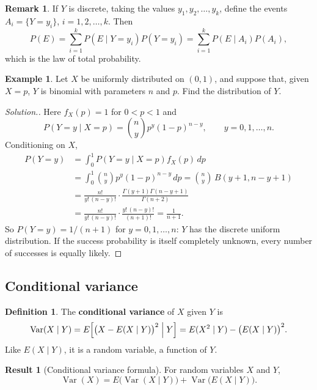 \documentclass[11pt,a4paper]{article}
\theoremstyle{definition}
\newtheorem{defn}[thm]{Definition}
\newtheorem{exa}[thm]{Example}
\newtheorem{result}[thm]{Result}
\newtheorem*{remark}{Remark}
\newenvironment{solution}
  {\renewcommand{\qedsymbol}{}\begin{proof}[\textit{Solution}.]}
  {\end{proof}}
\DeclareMathOperator{\Var}{Var}
\begin{document}
\begin{remark}
If $Y$ is discrete, taking the values $y_1, y_2, \dots, y_k$, define the events $A_i = \{Y = y_i\}$, $i = 1, 2, \dots, k$. Then
\[
P(E) = \sum_{i=1}^kP(E \mid Y = y_i)P(Y = y_i) = \sum_{i=1}^kP(E \mid A_i)P(A_i) ,
\]
which is the law of total probability.
\end{remark}

\begin{exa}\label{exa:beta-binomial}
Let $X$ be uniformly distributed on $(0, 1)$, and suppose that, given $X = p$, $Y$ is binomial with parameters $n$ and $p$. Find the
distribution of $Y$.
\end{exa}

\begin{solution}
Here $f_X(p) = 1$ for $0 < p < 1$ and
\[
P(Y = y \mid X = p) = \binom nyp^y(1 - p)^{n-y} , \qquad y = 0, 1, \dots, n .
\]
Conditioning on $X$,
\begin{align*}
P(Y = y) &= \int_0^1P(Y = y \mid X = p)f_X(p)\,dp \\
&= \int_0^1\binom nyp^y(1 - p)^{n-y}\,dp = \binom ny\,B(y + 1, n - y + 1) \\
&= \frac{n!}{y!\,(n - y)!}\cdot\frac{\Gamma(y + 1)\Gamma(n - y + 1)}{\Gamma(n + 2)} \\
&= \frac{n!}{y!\,(n - y)!}\cdot\frac{y!\,(n - y)!}{(n + 1)!} = \frac{1}{n + 1} .
\end{align*}
So $P(Y = y) = 1/(n + 1)$ for $y = 0, 1, \dots, n$: $Y$ has the discrete uniform distribution. If the success probability is itself completely
unknown, every number of successes is equally likely.
\end{solution}

\subsection{Conditional variance}
\begin{defn}
The \textbf{conditional variance} of $X$ given $Y$ is
\[
\Var(X \mid Y) = E\Bigl[\bigl(X - E(X \mid Y)\bigr)^2 \Bigm| Y\Bigr] = E(X^2 \mid Y) - \bigl(E(X \mid Y)\bigr)^2 .
\]
Like $E(X \mid Y)$, it is a random variable, a function of $Y$.
\end{defn}

\begin{result}[Conditional variance formula]\label{res:cond-var}
For random variables $X$ and $Y$,
\[
\Var(X) = E\bigl(\Var(X \mid Y)\bigr) + \Var\bigl(E(X \mid Y)\bigr) .
\]
\end{result}
\end{document}
